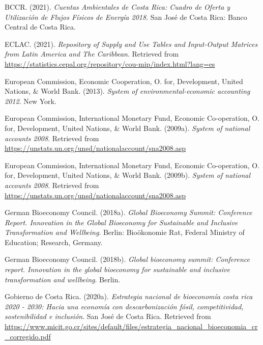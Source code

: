 \documentclass[
  letterpaper,
  DIV=11,
  numbers=noendperiod]{scrartcl}
\newlength{\cslhangindent}
\newenvironment{CSLReferences}[2] %
 {\begin{list}{}{%
  \setlength{\itemindent}{0pt}
  \setlength{\leftmargin}{0pt}
  \setlength{\parsep}{0pt}
  \ifodd #1
   \setlength{\leftmargin}{\cslhangindent}
   \setlength{\itemindent}{-1\cslhangindent}
  \fi
  \setlength{\itemsep}{#2\baselineskip}}}
 {\end{list}}
\begin{document}
\label{refs}
\begin{CSLReferences}{1}{0}
BCCR. (2021). \emph{Cuentas {Ambientales} de {Costa} {Rica}: {Cuadro} de
{Oferta} y {Utilización} de {Flujos} {Físicos} de {Energía} 2018}. San
José de Costa Rica: Banco Central de Costa Rica.

ECLAC. (2021). \emph{{Repository} of {Supply} and {Use Tables} and
{Input-Output Matrices} from {Latin America} and {The Caribbean}}.
Retrieved from
\url{https://statistics.cepal.org/repository/cou-mip/index.html?lang=es}

European Commission, Economic Cooperation, O. for, Development, United
Nations, \& World Bank. (2013). \emph{System of environmental-economic
accounting 2012}. New York.

European Commission, International Monetary Fund, Economic Co-operation,
O. for, Development, United Nations, \& World Bank. (2009a).
\emph{System of national accounts 2008}. Retrieved from
\url{https://unstats.un.org/unsd/nationalaccount/sna2008.asp}

European Commission, International Monetary Fund, Economic Co-operation,
O. for, Development, United Nations, \& World Bank. (2009b).
\emph{System of national accounts 2008}. Retrieved from
\url{https://unstats.un.org/unsd/nationalaccount/sna2008.asp}

German Bioeconomy Council. (2018a). \emph{Global {Bioeconomy} {Summit}:
{Conference} {Report}. {Innovation} in the {Global} {Bioeconomy} for
{Sustainable} and {Inclusive} {Transformation} and {Wellbeing}}. Berlin:
Bioökonomie Rat, Federal Ministry of Education; Research, Germany.

German Bioeconomy Council. (2018b). \emph{Global bioeconomy summit:
Conference report. Innovation in the global bioeconomy for sustainable
and inclusive transformation and wellbeing}. Berlin.

Gobierno de Costa Rica. (2020a). \emph{Estrategia nacional de
bioeconomía costa rica 2020 - 2030: Hacia una economía con
descarbonización fósil, competitividad, sostenibilidad e inclusión}. San
José de Costa Rica. Retrieved from
\url{https://www.micit.go.cr/sites/default/files/estrategia_nacional_bioeconomia_cr_corregido.pdf}


\end{CSLReferences}
\end{document}
